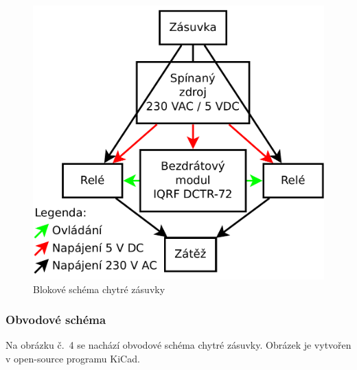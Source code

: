 \documentclass[12pt,a4paper,oneside]{article}
\begin{document}
\begin{figure}[H]
\centering
\label{fig:blokove-schema-zasuvky}
\includegraphics[width = 128mm]{img/blokove-schema-zasuvky.pdf}
\caption{Blokové schéma chytré zásuvky}
\end{figure}

\newpage

\subsubsection{Obvodové schéma}

Na obrázku č.~4 se nachází obvodové schéma chytré zásuvky. Obrázek je vytvořen v open-source programu KiCad\cite{sw/kicad}.
\end{document}
